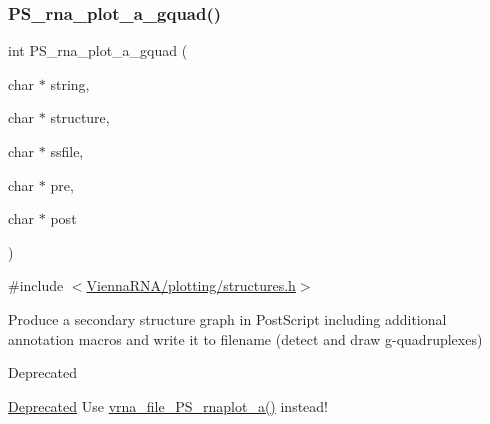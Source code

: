 \subsubsection{\texorpdfstring{PS\_rna\_plot\_a\_gquad()}{PS\_rna\_plot\_a\_gquad()}}
{\footnotesize\ttfamily int P\+S\+\_\+rna\+\_\+plot\+\_\+a\+\_\+gquad (\begin{DoxyParamCaption}\item[{char $\ast$}]{string,  }\item[{char $\ast$}]{structure,  }\item[{char $\ast$}]{ssfile,  }\item[{char $\ast$}]{pre,  }\item[{char $\ast$}]{post }\end{DoxyParamCaption})}



{\ttfamily \#include $<$\mbox{\hyperlink{plotting_2structures_8h}{Vienna\+R\+N\+A/plotting/structures.\+h}}$>$}



Produce a secondary structure graph in Post\+Script including additional annotation macros and write it to \textquotesingle{}filename\textquotesingle{} (detect and draw g-\/quadruplexes) 

\begin{DoxyRefDesc}{Deprecated}
\item[\mbox{\hyperlink{deprecated__deprecated000177}{Deprecated}}]Use \mbox{\hyperlink{group__plotting__utils_ga139a31dd0ba9fc6612431f67de901c31}{vrna\+\_\+file\+\_\+\+P\+S\+\_\+rnaplot\+\_\+a()}} instead! \end{DoxyRefDesc}
